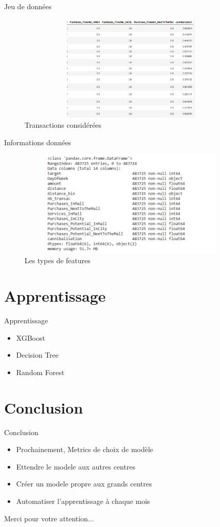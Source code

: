 \documentclass{beamer}
\begin{document}
\begin{frame}{Jeu de données}
\begin{figure}[H]
    \includegraphics[width=11cm,height=5.1cm]{images/dataset_2.png}
    \caption{ Transactions considérées}
    \label{fig:L1}
\end{figure}
\end{frame} 
\begin{frame}{Informations données}
\begin{figure}[H]
    \includegraphics[width=11cm,height=5.1cm]{images/data_infos.png}
    \caption{ Les types de features}
    \label{fig:L1}
\end{figure}
\end{frame} 

\section{Apprentissage}
\begin{frame}{Apprentissage}
\begin{itemize}
		\item XGBoost
		\item Decision Tree
		\item Random Forest
\end{itemize}
\end{frame}




\section{Conclusion}
\begin{frame}{Conclusion}
\begin{itemize}
		\item Prochainement, Metrics de choix de modèle
		\item Ettendre le modele aux autres centres
		\item Créer un modele propre aux grands centres
		\item Automatiser l'apprentissage à chaque mois
\end{itemize}
\end{frame}


\begin{frame}
  \begin{block}{}
  \centering
  Merci pour votre attention...
  \end{block}
\end{frame}
\end{document}

